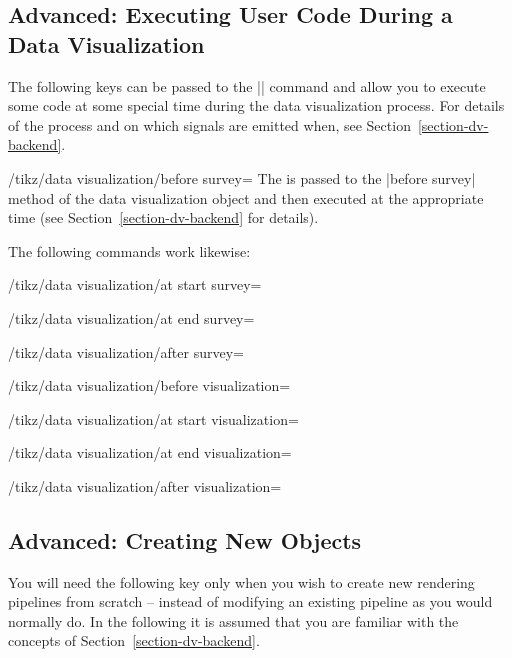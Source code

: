 \subsection{Advanced: Executing User Code During a Data Visualization}
\label{section-dv-user-code}

The following keys can be passed to the |\datavisualization| command
and allow you to execute some code at some special time during the
data visualization process. For details of the process and on which
signals are emitted when,
see Section~\ref{section-dv-backend}.

\begin{key}{/tikz/data visualization/before survey=}
  The  is passed to the |before survey| method of the data
  visualization object and then executed at the appropriate time (see
  Section~\ref{section-dv-backend} for details).

  The following commands work likewise:
\end{key}
\begin{key}{/tikz/data visualization/at start survey=}
\end{key}
\begin{key}{/tikz/data visualization/at end survey=}
\end{key}
\begin{key}{/tikz/data visualization/after survey=}
\end{key}
\begin{key}{/tikz/data visualization/before visualization=}
\end{key}
\begin{key}{/tikz/data visualization/at start visualization=}
\end{key}
\begin{key}{/tikz/data visualization/at end visualization=}
\end{key}
\begin{key}{/tikz/data visualization/after visualization=}
\end{key}



\subsection{Advanced: Creating New Objects}

You will need the following key only when you wish to create new
rendering pipelines from scratch -- instead of modifying an existing
pipeline as you would normally do. In the following it is assumed that
you are familiar with the concepts of Section~\ref{section-dv-backend}.

